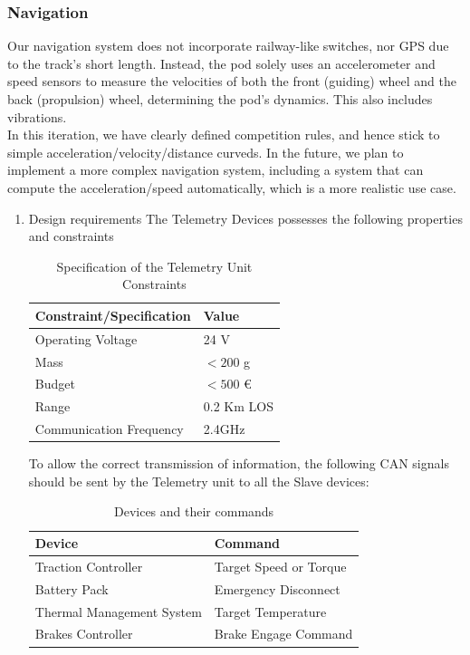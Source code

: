 \subsubsection*{Navigation}
Our navigation system does not incorporate railway-like switches, nor GPS due to the track's short length. Instead, the pod solely uses an accelerometer and speed sensors to measure the velocities of both the front (guiding) wheel and the back (propulsion) wheel,
determining the pod's dynamics. This also includes vibrations.\\
In this iteration, we have clearly defined competition rules, and hence stick to simple acceleration/velocity/distance curveds. In the future, we plan to implement a more complex navigation system, including a system that can compute the acceleration/speed automatically, which is a more realistic use case.
\begin{enumerate}
    \item Design requirements
The Telemetry Devices possesses the following properties and constraints

\begin{table}[htbp]
    \centering
    \begin{tabular}{|l|l|}
        \toprule
        \textbf{Constraint/Specification} & \textbf{Value} \\
        \midrule
        Operating Voltage & 24 V \\
        Mass & $<200$ g \\
        Budget & $<500$ € \\
        Range & 0.2 Km LOS \\
        Communication Frequency & 2.4GHz \\
        \bottomrule
    \end{tabular}
     \caption{Specification of the Telemetry Unit Constraints}
\label{tab:Telemetry Constraints}
\end{table}

To allow the correct transmission of information, the following CAN signals should be sent by the Telemetry unit to all the Slave devices:
\begin{table}[htbp]
    \centering
    \begin{tabular}{|l|l|}
        \textbf{Device} & \textbf{Command} \\
        \midrule
        Traction Controller & Target Speed or Torque \\
        Battery Pack & Emergency Disconnect \\
        Thermal Management System & Target Temperature \\
        Brakes Controller & Brake Engage Command \\
        \bottomrule
    \end{tabular}
 \caption{Devices and their commands}
\label{tab:Command devices.}
\end{table}


\end{enumerate}

